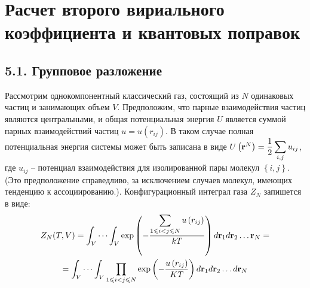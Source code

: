 \section{Расчет второго вириального коэффициента и квантовых поправок}

\subsection*{\textbf{5.1.} Групповое разложение \cite{eremin, hirsch}}


Рассмотрим однокомпонентный классический газ, состоящий из $N$ одинаковых частиц и занимающих объем $V$. Предположим, что парные взаимодействия частиц являются центральными, и общая потенциальная энергия $U$ является суммой парных взаимодействий частиц $u = u(r_{ij})$. В таком случае полная потенциальная энергия системы может быть записана в виде $U \left( \mathbf{r}^N \right) = \displaystyle \dfrac{1}{2} \sum_{i, j} u_{ij}$, где $u_{ij}$ -- потенциал взаимодействия для изолированной пары молекул $\left\{ i, j \right\}$. (Это предположение справедливо, за исключением случаев молекул, имеющих тенденцию к ассоциированию.). Конфигурационный интеграл газа $Z_N$ запишется в виде:
\vverh
\begin{gather}
	Z_N (T, V) = \int_V \cdots \int_V \exp \left( - \frac{\displaystyle\sum_{1 \leqslant i < j \leqslant N} u \left( r_{ij} \right)}{kT} \right) d \mathbf{r}_1 d \mathbf{r}_2 \dots \mathbf{r}_N = \notag \\
	= \int_V \cdots \int_V \prod_{1 \leqslant i < j \leqslant N} \exp \left( - \frac{u \left( r_{ij} \right)}{KT} \right) d \mathbf{r}_1 d \mathbf{r}_2 \dots d \mathbf{r}_N \label{confint}
\end{gather}

